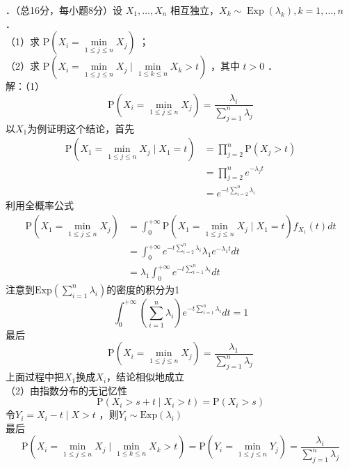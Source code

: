 \documentclass[UTF8,openany]{book}
\begin{document}
．（总16分，每小题8分）设 $X_{1}, \ldots, X_{n}$ 相互独立，$X_{k} \sim \operatorname{Exp}\left(\lambda_{k}\right), k=1, \ldots, n$ ．\\
（1）求 $\mathrm{P}\left(X_{i}=\min\limits_{1 \leq j \leq n} X_{j}\right)$ ；\\
（2）求 $\mathrm{P}\left(X_{i}=\min\limits_{1 \leq j \leq n} X_{j} \mid \min\limits_{1 \leq k \leq n} X_{k}>t\right)$ ，其中 $t>0$ ．\\
解：（1）
\[
\mathrm{P}\left(X_{i}=\min\limits_{1 \leq j \leq n} X_{j}\right)=\frac{\lambda_i}{\sum\limits_{j=1}^n \lambda_j}
\]
以$X_1$为例证明这个结论，首先
\begin{align*}
	\mathrm{P}\left(X_{1}=\min\limits_{1 \leq j \leq n} X_{j}\mid X_1=t \right) & =\prod\limits_{j=2}^{n} \mathrm{P}(X_j>t) \\
	& = \prod\limits_{j=2}^{n} e^{-\lambda_j t}\\
	&=e^{-t \sum\limits_{i=2}^{n} \lambda_i}
\end{align*}
利用全概率公式
\begin{align*}
	\mathrm{P}\left(X_{1}=\min\limits_{1 \leq j \leq n} X_{j}\right) & = \int_{0}^{+\infty} 	\mathrm{P}\left(X_{1}=\min\limits_{1 \leq j \leq n} X_{j}\mid X_1=t \right) f_{X_1}(t)dt  \\
	& =\int_{0}^{+\infty} e^{-t \sum\limits_{i=2}^{n} \lambda_i} \lambda_1 e^{-\lambda_1 t}dt\\
	&=\lambda_1 \int_{0}^{+\infty} e^{-t \sum\limits_{i=1}^{n} \lambda_i}  dt
\end{align*}
注意到$\mathrm{Exp}\left( \sum_{i=1}^{n} \lambda_i \right) $的密度的积分为1
\[
\int_{0}^{+\infty} \left(\sum_{i=1}^{n} \lambda_i \right) e^{-t \sum\limits_{i=1}^{n} \lambda_i}  dt=1
\]
最后
\[
\mathrm{P}\left(X_{i}=\min\limits_{1 \leq j \leq n} X_{j}\right)=\frac{\lambda_1}{\sum\limits_{j=1}^n \lambda_j}
\]
上面过程中把$X_1$换成$X_i$，结论相似地成立\\
（2）由指数分布的无记忆性
\[
\mathrm{P}\left(X_i>s+t \mid X_i>t \right) = \mathrm{P}(X_i>s) 
\]
令$Y_i=X_i-t\mid X>t$ ，则$Y_i\sim \mathrm{Exp}(\lambda_i)$\\
最后
\[
\mathrm{P}\left(X_{i}=\min\limits_{1 \leq j \leq n} X_{j} \mid \min\limits_{1 \leq k \leq n} X_{k}>t\right)=\mathrm{P}\left(Y_{i}=\min\limits_{1 \leq j \leq n} Y_{j}\right)=\frac{\lambda_i}{\sum\limits_{j=1}^n \lambda_j}
\]\\
\end{document}
